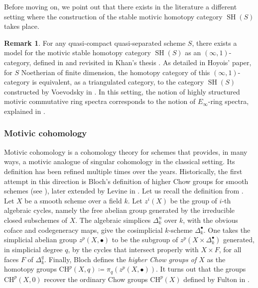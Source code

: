 \documentclass[10pt]{amsart}
\theoremstyle{definition}
\newtheorem{rmk}[defn]{Remark}
\theoremstyle{plain}
\numberwithin{equation}{section}
\newcommand{\0}{\emptyset}
\newcommand{\SH}{{\operatorname{SH}}}
\begin{document}
Before moving on, we point out that there exists in the literature a different setting where the construction of the stable motivic homotopy category $\SH(S)$ takes place.

\begin{rmk}
    For any quasi-compact quasi-separated scheme $S$, there exists a model for the motivic stable homotopy category $\SH(S)$ as an $(\infty,1)$-category, defined in \cite[Appendix C]{Hoy:Grothendieck} and revisited in Khan's thesis \cite{khan:thesis}. As detailed in Hoyois' paper, for $S$ Noetherian of finite dimension, the homotopy category of this $(\infty,1)$-category is equivalent, as a triangulated category, to the category $\SH(S)$ constructed by Voevodsky in \cite{voe:homotopy_theory}. In this setting, the notion of highly structured motivic commutative ring spectra corresponds to the notion of $E_\infty$-ring spectra, explained in \cite{May:Einfty}.
\end{rmk}

\subsubsection{Motivic cohomology}
\label{subsection:HZ}

Motivic cohomology is a cohomology theory for schemes that provides, in many ways, a motivic analogue of singular cohomology in the classical setting. Its definition has been refined multiple times over the years. Historically, the first attempt in this direction is Bloch's definition of higher Chow groups for smooth schemes (see \cite{Bloch:cycles}), later extended by Levine in \cite{Lev:cycles}. Let us recall the definition from \cite{Bloch:cycles}. Let $X$ be a smooth scheme over a field $k$. Let $z^i(X)$ be the group of $i$-th algebraic cycles, namely the free abelian group generated by the irreducible closed subschemes of $X$. The algebraic simplices $\Delta_k^n$ over $k$, with the obvious coface and codegeneracy maps, give the cosimplicial $k$-scheme $\Delta_k^{\bullet}$. One takes the simplicial abelian group $z^p(X,\bullet)$ to be the subgroup of $z^p(X \times \Delta_k^{\bullet})$ generated, in simplicial degree $q$, by the cycles that intersect properly with $X \times F$, for all faces $F$ of $\Delta_k^q$. Finally, Bloch defines the \emph{higher Chow groups of $X$} as the homotopy groups $\text{CH}^p(X,q) \coloneqq \pi_q(z^p(X,\bullet))$. It turns out that the groups $\text{CH}^p(X,0)$ recover the ordinary Chow groups $\text{CH}^p(X)$ defined by Fulton in \cite{Fulton}.
\end{document}
